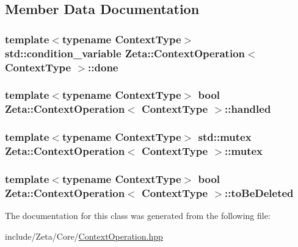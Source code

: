 \subsection{Member Data Documentation}
\hypertarget{classZeta_1_1ContextOperation_a19abe2b5eb5218526a7e8823aec107a4}{
\subsubsection[{done}]{\setlength{\rightskip}{0pt plus 5cm}template$<$typename Context\+Type$>$ std\+::condition\+\_\+variable {\bf Zeta\+::\+Context\+Operation}$<$ Context\+Type $>$\+::done\hspace{0.3cm}{\ttfamily [protected]}}}\label{classZeta_1_1ContextOperation_a19abe2b5eb5218526a7e8823aec107a4}
\hypertarget{classZeta_1_1ContextOperation_a015a74ff36e2bc7d9b949ad8d12d7ca1}{
\subsubsection[{handled}]{\setlength{\rightskip}{0pt plus 5cm}template$<$typename Context\+Type$>$ bool {\bf Zeta\+::\+Context\+Operation}$<$ Context\+Type $>$\+::handled\hspace{0.3cm}{\ttfamily [protected]}}}\label{classZeta_1_1ContextOperation_a015a74ff36e2bc7d9b949ad8d12d7ca1}
\hypertarget{classZeta_1_1ContextOperation_a38829d81157a6de9612f541d86215a68}{
\subsubsection[{mutex}]{\setlength{\rightskip}{0pt plus 5cm}template$<$typename Context\+Type$>$ std\+::mutex {\bf Zeta\+::\+Context\+Operation}$<$ Context\+Type $>$\+::mutex\hspace{0.3cm}{\ttfamily [protected]}}}\label{classZeta_1_1ContextOperation_a38829d81157a6de9612f541d86215a68}
\hypertarget{classZeta_1_1ContextOperation_a74d249e9f1614a29999b811772a41c1b}{
\subsubsection[{to\+Be\+Deleted}]{\setlength{\rightskip}{0pt plus 5cm}template$<$typename Context\+Type$>$ bool {\bf Zeta\+::\+Context\+Operation}$<$ Context\+Type $>$\+::to\+Be\+Deleted\hspace{0.3cm}{\ttfamily [protected]}}}\label{classZeta_1_1ContextOperation_a74d249e9f1614a29999b811772a41c1b}


The documentation for this class was generated from the following file\+:\begin{DoxyCompactItemize}
\item 
include/\+Zeta/\+Core/\hyperlink{ContextOperation_8hpp}{Context\+Operation.\+hpp}\end{DoxyCompactItemize}
